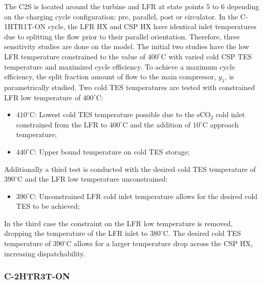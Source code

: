 \begin{paracol}{2}
\linenumbers
\switchcolumn

The C2S is located around the turbine and LFR at state points 5 to 6 depending on the charging cycle configuration: pre, parallel, post or circulator. In the C-1HTR1T-ON cycle, the LFR HX and CSP HX have identical inlet temperatures due to splitting the flow prior to their parallel orientation. Therefore, three sensitivity studies are done on the model. The initial two studies have the low LFR temperature constrained to the value of $400^{\circ}$C with varied cold CSP TES temperature and maximized cycle efficiency. To achieve a maximum cycle efficiency, the split fraction amount of flow to the main compressor, $y_{1}$, is parametrically studied.
Two cold TES temperatures are tested with constrained LFR low temperature of $400^{\circ}$C: 
\begin{itemize}
    \item	$410^{\circ}$C: Lowest cold TES temperature possible due to the sCO$_2$ cold inlet constrained from the LFR to $400^{\circ}$C and the addition of $10^{\circ}$C approach temperature;
    \item	$440^{\circ}$C: Upper bound temperature on cold TES storage;
\end{itemize}

Additionally a third test is conducted with the desired cold TES temperature of $390^{\circ}$C and the LFR low temperature unconstrained:

\begin{itemize}
    \item	$390^{\circ}$C: Unconstrained LFR cold inlet temperature allows for the desired cold TES to be achieved;
\end{itemize}

In the third case the constraint on the LFR low temperature is removed, dropping the temperature of the LFR inlet to $380^{\circ}$C. The desired cold TES temperature of $390^{\circ}$C allows for a larger temperature drop across the CSP HX, increasing dispatchability.


\subsubsection{C-2HTR3T-ON} 


\end{paracol}
